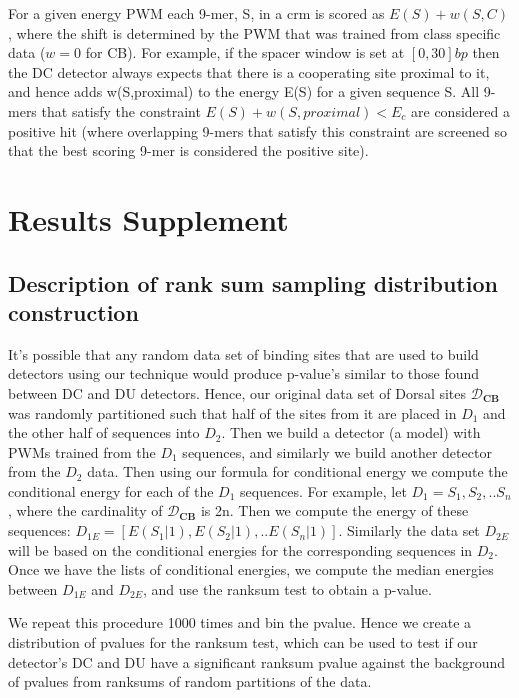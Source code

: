 For a given energy PWM each 9-mer, S, in a crm is scored as $E(S)+w(S,C)$, where the shift is determined by the PWM that was trained from class specific data ($w=0$ for CB).  For example, if the spacer window is set at $[0,30]bp$ then the DC detector always expects that there is a cooperating site proximal to it, and hence adds w(S,proximal) to the energy E(S) for a given sequence S.  All 9-mers that satisfy the constraint $E(S) + w(S,proximal) < E_c$ are considered a positive hit (where overlapping 9-mers that satisfy this constraint are screened so that the best scoring 9-mer is considered the positive site).
\section{Results Supplement}\label{rsup}

\subsection{Description of rank sum sampling distribution construction}\label{ranks}
%

	It's possible that any random data set of binding sites that are used to build detectors using our technique would produce p-value's similar to those found between DC and DU detectors.  Hence, our original data set of Dorsal sites $\mathcal D_{\textbf{CB}}$ was randomly partitioned such that half of the sites from it are placed in $D_1$ and the other half of sequences into $D_2$.  Then we build a detector (a model) with PWMs trained from the $D_1$ sequences, and similarly we build another detector from the $D_2$ data.  Then using our formula for conditional energy we compute the conditional energy for each of the $D_1$ sequences.  For example, let $D_1={S_1,S_2,..S_n}$, where the cardinality of $\mathcal D_{\textbf{CB}}$ is 2n.  Then we compute the energy of these sequences:  $D_{1E}=[E(S_1|1) , E( S_2|1) ,..E(S_n|1)]$.  Similarly the data set $D_{2E}$ will be based on the conditional energies for the corresponding sequences in $D_2$.  Once we have the lists of conditional energies, we compute the median energies between $D_{1E}$ and $D_{2E}$, and use the ranksum test to obtain a p-value.

We repeat this procedure 1000 times and bin the pvalue.  Hence we create a distribution of pvalues for the ranksum test, which can be used to test if our detector's DC and DU have a significant ranksum pvalue against the background of pvalues from ranksums of random partitions of the data.



